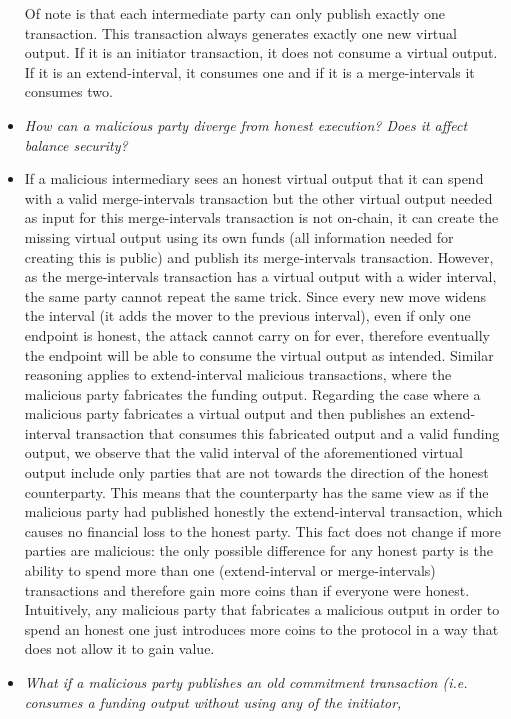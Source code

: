 \begin{itemize}
  Of note is that each intermediate party can only publish exactly one
  transaction. This transaction always generates exactly one new virtual output.
  If it is an initiator transaction, it does not consume a virtual output. If it
  is an extend-interval, it consumes one and if it is a merge-intervals it
  consumes two.
  \item \emph{How can a malicious party diverge from honest execution? Does it
  affect balance security?}
  \item If a malicious intermediary sees an honest virtual output that it can
  spend with a valid merge-intervals transaction but the other virtual output
  needed as input for this merge-intervals transaction is not on-chain, it can
  create the missing virtual output using its own funds (all information needed
  for creating this is public) and publish its merge-intervals transaction.
  However, as the merge-intervals transaction has a virtual output with a wider
  interval, the same party cannot repeat the same trick. Since every new move
  widens the interval (it adds the mover to the previous interval), even if only
  one endpoint is honest, the attack cannot carry on for ever, therefore
  eventually the endpoint will be able to consume the virtual output as
  intended. Similar reasoning applies to extend-interval malicious transactions,
  where the malicious party fabricates the funding output. Regarding the case
  where a malicious party fabricates a virtual output and then publishes an
  extend-interval transaction that consumes this fabricated output and a valid
  funding output, we observe that the valid interval of the aforementioned
  virtual output include only parties that are not towards the direction of the
  honest counterparty. This means that the counterparty has the same view as if
  the malicious party had published honestly the extend-interval transaction,
  which causes no financial loss to the honest party. This fact does not change
  if more parties are malicious: the only possible difference for any honest
  party is the ability to spend more than one (extend-interval or
  merge-intervals) transactions and therefore gain more coins than if everyone
  were honest. Intuitively, any malicious party that fabricates a malicious
  output in order to spend an honest one just introduces more coins to the
  protocol in a way that does not allow it to gain value.
  \item \emph{What if a malicious party publishes an old commitment transaction
  (i.e. consumes a funding output without using any of the initiator,
}
\end{itemize}
